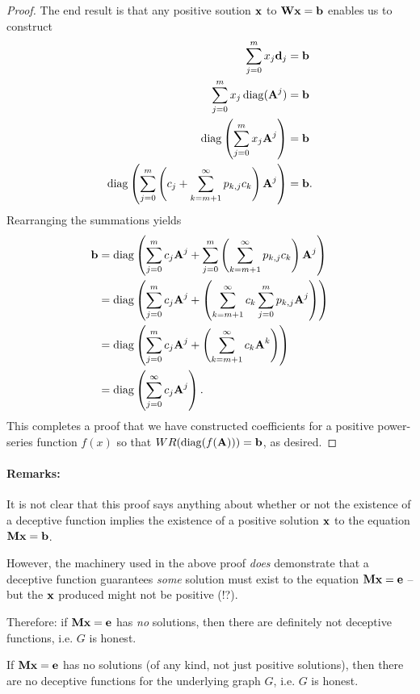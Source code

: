 \begin{proof}
The end result is that any positive soution $\textbf{x}$ to $\textbf{W}\textbf{x} = \textbf{b}$ enables us to construct
\begin{align}
  \sum_{j=0}^{m} x_j \textbf{d}_{j} &=  \textbf{b} \\
  \sum_{j=0}^{m} x_j \operatorname{diag}(\textbf{A}^j) &=  \textbf{b} \\
  \operatorname{diag}\left( \sum_{j=0}^{m} x_j \textbf{A}^j \right) &=  \textbf{b} \\
  \operatorname{diag}\left( \sum_{j=0}^{m} \left( c_j +  \sum_{k=m+1}^{\infty} p_{k,j} c_k \right) \textbf{A}^j \right) &=  \textbf{b}.
\end{align}
Rearranging the summations yields
\begin{align}
   \textbf{b} &=  \operatorname{diag}\left( \sum_{j=0}^{m} c_j \textbf{A}^j  + \sum_{j=0}^m \left( \sum_{k=m+1}^{\infty} p_{k,j} c_k \right) \textbf{A}^j \right) \\
  &= \operatorname{diag}\left( \sum_{j=0}^{m} c_j \textbf{A}^j  +  \left( \sum_{k=m+1}^{\infty} c_k \sum_{j=0}^m p_{k,j}  \textbf{A}^j \right)  \right) \\
  &= \operatorname{diag}\left( \sum_{j=0}^{m} c_j \textbf{A}^j  +  \left( \sum_{k=m+1}^{\infty} c_k \textbf{A}^k \right)  \right) \\
  &= \operatorname{diag} \left( \sum_{j=0}^{\infty} c_j \textbf{A}^j \right).
\end{align}
This completes a proof that we have constructed coefficients for a positive power-series function $f(x)$ so that $WR(\operatorname{diag}(f(\textbf{A}))) = \textbf{b}$, as desired.
\end{proof}

\paragraph{Remarks:}

It is not clear that this proof says anything about whether or not the existence of a deceptive function implies the existence of a positive solution $\textbf{x}$ to the equation $\textbf{M}\textbf{x} = \textbf{b}$.

However, the machinery used in the above proof \emph{does} demonstrate that a deceptive function guarantees \emph{some} solution must exist to the equation $\textbf{M}\textbf{x} = \textbf{e}$ -- but the $\textbf{x}$ produced might not be positive (!?).

Therefore: if $\textbf{M}\textbf{x} = \textbf{e}$ has \emph{no} solutions, then there are definitely not deceptive functions, i.e. $G$ is honest.

\begin{corollary}
  If $\textbf{M}\textbf{x} = \textbf{e}$ has no solutions (of any kind, not just positive solutions), then there are no deceptive functions for the underlying graph $G$, i.e. $G$ is honest.
\end{corollary}





